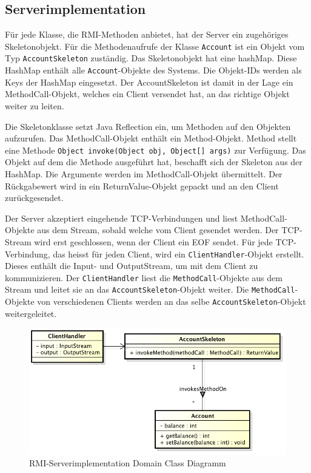 \subsection{Serverimplementation}
\label{sec:serverimplementation}

Für jede Klasse, die RMI-Methoden anbietet, hat der Server ein
zuge\-hö\-ri\-ges Skeletonobjekt. Für die Methodenaufrufe
der Klasse \texttt{Account} ist ein Objekt vom Typ
\texttt{AccountSkeleton} zuständig. Das Skeletonobjekt hat eine \gls{hashMap}. Diese
HashMap enthält alle \texttt{Account}-Objekte des Systems. Die Objekt-IDs
werden als Keys der HashMap eingesetzt. Der AccountSkeleton ist damit
in der Lage ein MethodCall-Objekt, welches ein Client versendet hat, an
das richtige Objekt weiter zu leiten. 

Die Skeletonklasse setzt Java Reflection ein, um Methoden auf den
Objekten aufzurufen. Das MethodCall-Objekt enthält ein
Method-Objekt. Method stellt eine Methode \verb|Object invoke(Object obj, Object[] args)|\- zur\- Ver\-füg\-ung. Das Objekt auf dem die Methode
ausgeführt hat, beschafft sich der Skeleton aus der HashMap. Die
Argumente werden im MethodCall-Objekt übermittelt. Der Rückgabewert
wird in ein ReturnValue-Objekt gepackt und an den Client zurückgesendet.

Der Server akzeptiert eingehende TCP-Verbindungen und liest MethodCall-Objekte aus
dem Stream, sobald welche vom Client gesendet
werden. Der TCP-Stream wird erst geschlossen, wenn der Client ein EOF
sendet. Für jede TCP-Verbindung, das heisst für jeden Client, wird
ein \texttt{ClientHandler}-Objekt erstellt. Dieses enthält die Input-
und OutputStream, um mit dem Client zu kommunizieren. Der
\texttt{ClientHandler} liest die \texttt{MethodCall}-Objekte aus dem
Stream und leitet sie an das \texttt{AccountSkeleton}-Objekt weiter. Die
\texttt{Method\-Call}-Objekte von verschiedenen Clients werden an das selbe
\-\texttt{Ac\-count\-Skeleton}-Objekt weitergeleitet.

\begin{figure}[ht]
  \centering
\includegraphics[scale = 0.5]{images_objectcaching/rmiServerImpl}  
  \caption{RMI-Serverimplementation Domain Class Diagramm}
  \label{fig:rmiserverimpl}
\end{figure}

